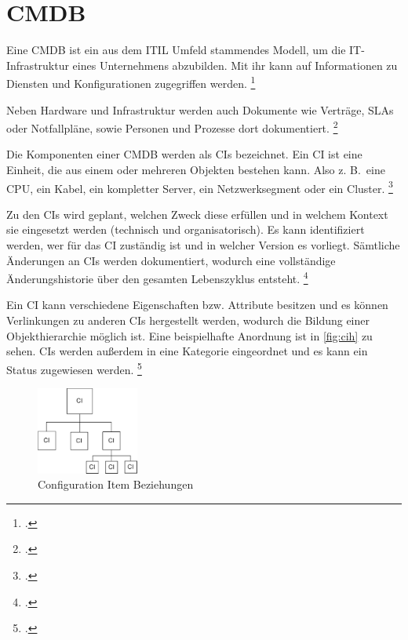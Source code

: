 \section{CMDB}
Eine \acf{CMDB} ist ein aus dem \acf{ITIL} Umfeld stammendes Modell, um die IT-Infrastruktur eines Unternehmens abzubilden. Mit ihr kann auf Informationen zu Diensten und Konfigurationen zugegriffen werden.
\footcite[Vgl.][70\psq]{Olbrich_2008_ITIL}

Neben Hardware und Infrastruktur werden auch Dokumente wie Verträge, \acfp{SLA} oder Notfallpläne, sowie  Personen und Prozesse dort dokumentiert.
\footcite[Vgl.][253]{Sturm_2017_CMDB}


Die Komponenten einer \acs{CMDB} werden als \acfp{CI} bezeichnet. Ein \acf{CI} ist eine Einheit, die aus einem oder mehreren Objekten bestehen kann. Also z. B.~eine CPU, ein Kabel, ein kompletter Server, ein Netzwerksegment oder ein Cluster.
\footcite[Vgl.][70\psq]{Olbrich_2008_ITIL}

Zu den \acsp{CI} wird geplant, welchen Zweck diese erfüllen und in welchem Kontext sie eingesetzt werden (technisch und organisatorisch).
Es kann identifiziert werden, wer für das \acs{CI} zuständig ist und in welcher Version es vorliegt.
Sämtliche Änderungen an \acsp{CI} werden dokumentiert, wodurch eine vollständige Änderungshistorie über den gesamten Lebenszyklus entsteht.
\footcite[Vgl.][70\psq]{Olbrich_2008_ITIL}

Ein \acs{CI} kann verschiedene Eigenschaften bzw. Attribute besitzen und es können Verlinkungen zu anderen \acsp{CI} hergestellt werden, wodurch die Bildung einer Objekthierarchie möglich ist. Eine beispielhafte Anordnung ist in \autoref{fig:cih} zu sehen. \acsp{CI} werden außerdem in eine Kategorie eingeordnet und es kann ein Status zugewiesen werden.
\footcite[Vgl.][72\psqq]{Olbrich_2008_ITIL}

\begin{figure}[H]
  \centering
  \includegraphics[width=0.3\textwidth]{Anhang/cih}
  \caption{Configuration Item Beziehungen}
\label{fig:cih}
\end{figure}



